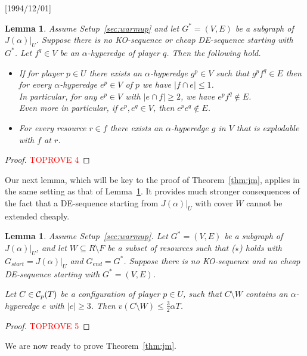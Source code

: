 \NeedsTeXFormat{LaTeX2e}[1994/12/01]\documentclass[letterpaper, 11pt]{article}
\newtheorem{lem}[thm]{Lemma}
\theoremstyle{definition}
\theoremstyle{remark}
\numberwithin{equation}{section}
\begin{document}
\begin{lem}\label{lem:simple}
  Assume Setup~\ref{sec:warmup} and let 
$G^* = (V, E)$ be a subgraph of $J(\alpha)|_U$. Suppose there is no
KO-sequence or cheap DE-sequence starting with $G^*$.
  Let $f^q\in V$ be an $\alpha$-hyperedge of
  player $q$. Then the following hold.
  \begin{itemize}
  \item[(i)]
    If for player $p\in U$ there exists an
    $\alpha$-hyperedge $g^p \in V$ such that $g^pf^q\in E$
    then for every $\alpha$-hyperedge $e^p \in V$ of $p$ we have $|f\cap e| \leq 1$.\\
In particular, for any $e^p \in V$ with
    $|e\cap f| \geq 2$, we have $e^pf^q\not\in E$. \\
    Even more in particular, if $e^p, e^q \in V$, then $e^pe^q \not\in
    E$.
    \item[(ii)]  For every resource $r \in f$
      there exists an $\alpha$-hyperedge $g$ in $V$ that is explodable with $f$ at $r$.
\end{itemize}
 \end{lem}
  \begin{proof}\textcolor{red}{TOPROVE 4}\end{proof}

Our next lemma, which will be key to the proof of
  Theorem~\ref{thm:jm}, applies in the same setting as that of
Lemma~\ref{lem:simple}. It provides much stronger consequences of the
fact that a DE-sequence starting from $J(\alpha)|_U$ with cover $W$
cannot be extended cheaply. 

\begin{lem}\label{lem:nongraph}
  Assume Setup~\ref{sec:warmup}. Let $G^*= (V,E)$ be a subgraph of $J(\alpha)|_U$, and let  $W\subseteq
R \setminus F$ be a subset of resources such 
that ($\star$) holds with $G_{start}=J(\alpha)|_U$ and $G_{end}=G^*$.
  Suppose there is no KO-sequence and no cheap DE-sequence starting
  with $G^* = (V,E)$. 

  Let $C\in {\cal C}_p(T)$ be a configuration of player $p\in
  U$, such that $C\setminus W$ contains an $\alpha$-hyperedge $e$
  with $|e|\geq 3$.
Then $v(C\setminus W) \leq \frac{3}{2}\alpha T$. \end{lem}


\begin{proof}\textcolor{red}{TOPROVE 5}\end{proof}

We are now ready to prove Theorem~\ref{thm:jm}.
 
\end{document}
